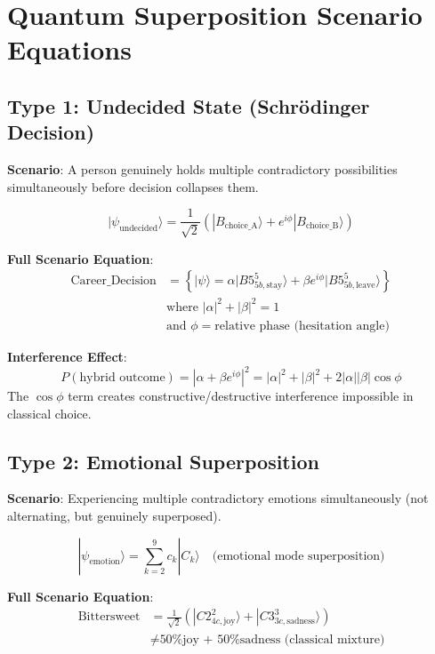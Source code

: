 \documentclass[11pt,twoside]{book}
\begin{document}
\section{Quantum Superposition Scenario Equations}

\subsection{Type 1: Undecided State (Schr\"{o}dinger Decision)}

\textbf{Scenario}: A person genuinely holds multiple contradictory possibilities
simultaneously before decision collapses them.

\begin{equation}
\boxed{
    |\psi_{\mathrm{undecided}}\rangle = \frac{1}{\sqrt{2}}
    \left( |B_{\mathrm{choice\_A}}\rangle + e^{i\phi} |B_{\mathrm{choice\_B}}\rangle \right)
}
\end{equation}

\textbf{Full Scenario Equation}:
\begin{align}
    \text{Career\_Decision} &= \left\{
    |\psi\rangle = \alpha |B5^5_{5b,\text{stay}}\rangle
    + \beta e^{i\phi} |B5^5_{5b,\text{leave}}\rangle
    \right\} \\
    &\text{where } |\alpha|^2 + |\beta|^2 = 1 \\
    &\text{and } \phi = \text{relative phase (hesitation angle)}
\end{align}

\textbf{Interference Effect}:
\[
    P(\text{hybrid outcome}) = |\alpha + \beta e^{i\phi}|^2
    = |\alpha|^2 + |\beta|^2 + 2|\alpha||\beta|\cos\phi
\]
The $\cos\phi$ term creates constructive/destructive interference impossible in classical choice.

\subsection{Type 2: Emotional Superposition}

\textbf{Scenario}: Experiencing multiple contradictory emotions simultaneously
(not alternating, but genuinely superposed).

\begin{equation}
\boxed{
    |\psi_{\mathrm{emotion}}\rangle = \sum_{k=2}^{9} c_k |C_k\rangle
    \quad \text{(emotional mode superposition)}
}
\end{equation}

\textbf{Full Scenario Equation}:
\begin{align}
    \text{Bittersweet} &= \frac{1}{\sqrt{2}}
    \left( |C2^2_{4c,\text{joy}}\rangle + |C3^3_{3c,\text{sadness}}\rangle \right) \\
    &\neq \text{50\% joy + 50\% sadness (classical mixture)}
\end{align}
\end{document}
